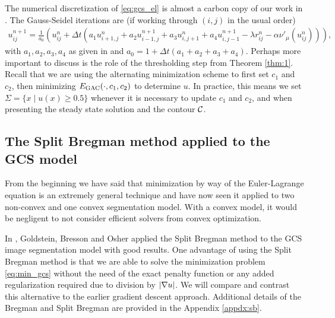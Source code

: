 The numerical discretization of \eqref{eq:gcs_el} is almost a carbon copy of our work in . The Gauss-Seidel iterations are (if working through $(i,j)$ in the usual order)
\begin{align*}
u^{n+1}_{ij} 
= \frac{1}{a_0} 
\left( u^n_{ij} + \Delta t 
\left( a_1 u^n_{i+1,j} + a_2 u^{n+1}_{i-1,j} + a_3 u^{n}_{i,j+1} + a_4 u^{n+1}_{i,j-1}
- \lambda r_{ij}^n
- \alpha \nu'_\mu( u^n_{ij} )
\right)
\right),
\end{align*}
with $a_1,a_2,a_3,a_4$ as given in  and $a_0 = 1 + \Delta t(a_1 + a_2 + a_3 + a_4)$. Perhaps more important to discuss is the role of the thresholding step from Theorem \ref{thm:1}. Recall that we are using the alternating minimization scheme to first set $c_1$ and $c_2$, then minimizing $E_\textrm{GAC}(\cdot, c_1, c_2)$ to determine $u$. In practice, this means we set $\Sigma = \{x \mid u(x) \geq 0.5\}$ whenever it is necessary to update $c_1$ and $c_2$, and when presenting the steady state solution and the contour $\mathcal{C}$.


\subsection{The Split Bregman method applied to the GCS model}
From the beginning we have said that minimization by way of the Euler-Lagrange equation is an extremely general technique and have now seen it applied to two non-convex and one convex segmentation model. With a convex model, it would be negligent to not consider efficient solvers from convex optimization. 

In \cite{goldstein2010geometric}, Goldstein, Bresson and Osher applied the Split Bregman method \cite{goldstein2009split} to the GCS image segmentation model with good results. One advantage of using the Split Bregman method is that we are able to solve the minimization problem \eqref{eq:min_gcs} without the need of the exact penalty function  or any added regularization required due to division by $\lvert\nabla u\rvert$. We will compare and contrast this alternative to the earlier gradient descent approach. Additional details of the Bregman and Split Bregman are provided in the Appendix \ref{appdx:sb}.  

